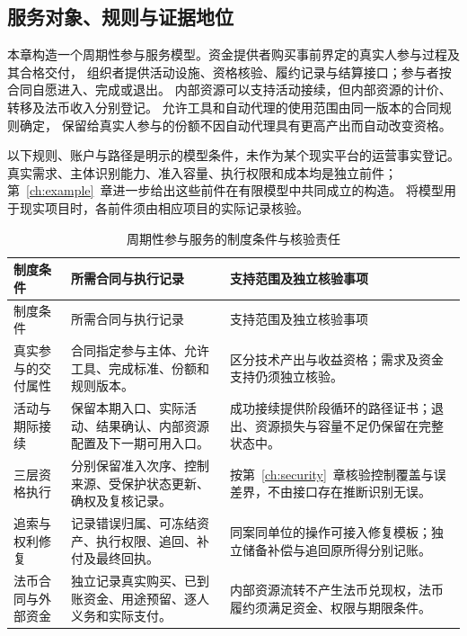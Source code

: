 \documentclass[12pt,a4paper,openany]{report}
\begin{document}
\begin{CJK*}{UTF8}{gkai}
\section{服务对象、规则与证据地位}
本章构造一个周期性参与服务模型。资金提供者购买事前界定的真实人参与过程及其合格交付，
组织者提供活动设施、资格核验、履约记录与结算接口；参与者按合同自愿进入、完成或退出。
内部资源可以支持活动接续，但内部资源的计价、转移及法币收入分别登记。
允许工具和自动代理的使用范围由同一版本的合同规则确定，
保留给真实人参与的份额不因自动代理具有更高产出而自动改变资格。

以下规则、账户与路径是明示的模型条件，未作为某个现实平台的运营事实登记。
真实需求、主体识别能力、准入容量、执行权限和成本均是独立前件；
第~\ref{ch:example}~章进一步给出这些前件在有限模型中共同成立的构造。
将模型用于现实项目时，各前件须由相应项目的实际记录核验。

\begingroup
\small
\renewcommand{\arraystretch}{1.23}
\begin{longtable}{P{3.1cm}P{5.4cm}P{6.2cm}}
\caption{周期性参与服务的制度条件与核验责任}
\label{tab:service-conditions}\\
\toprule
制度条件 & 所需合同与执行记录 & 支持范围及独立核验事项\\
\midrule
\endfirsthead
\toprule
制度条件 & 所需合同与执行记录 & 支持范围及独立核验事项\\
\midrule
\endhead
\bottomrule
\endfoot
真实参与的交付属性
& 合同指定参与主体、允许工具、完成标准、份额和规则版本。
& 区分技术产出与收益资格；需求及资金支持仍须独立核验。\\
活动与期际接续
& 保留本期入口、实际活动、结果确认、内部资源配置及下一期可用入口。
& 成功接续提供阶段循环的路径证书；退出、资源损失与容量不足仍保留在完整状态中。\\
三层资格执行
& 分别保留准入次序、控制来源、受保护状态更新、确权及复核记录。
& 按第~\ref{ch:security}~章核验控制覆盖与误差界，不由接口存在推断识别无误。\\
追索与权利修复
& 记录错误归属、可冻结资产、执行权限、追回、补付及最终回执。
& 同案同单位的操作可接入修复模板；独立储备补偿与追回原所得分别记账。\\
法币合同与外部资金
& 独立记录真实购买、已到账资金、用途预留、逐人义务和实际支付。
& 内部资源流转不产生法币兑现权，法币履约须满足资金、权限与期限条件。\\
\end{longtable}
\endgroup


\end{CJK*}
\end{document}
